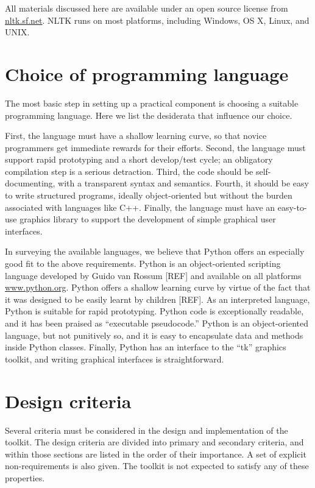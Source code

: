 \documentclass[11pt]{article}
\begin{document}
All materials discussed here are available under an open
source license from \url{nltk.sf.net}.
NLTK runs on most platforms, including Windows, OS X, Linux, and
UNIX.

\section{Choice of programming language}

The most basic step in setting up a practical component is choosing a
suitable programming language.  Here we list the desiderata that influence
our choice.

First, the language must have a shallow learning curve, so that novice
programmers get immediate rewards for their efforts.
Second, the language must support rapid prototyping and a short develop/test cycle;
an obligatory compilation step is a serious detraction.
Third, the code should be self-documenting,
with a transparent syntax and semantics.
Fourth, it should be easy to write structured programs, ideally object-oriented
but without the burden associated with languages like C++.
Finally, the language must have an easy-to-use graphics library to support
the development of simple graphical user interfaces.

In surveying the available languages, we believe that Python offers an especially good
fit to the above requirements.  Python is an object-oriented scripting language
developed by Guido van Rossum [REF] and available on all platforms
\url{www.python.org}.
Python offers a shallow learning curve by virtue of the
fact that it was designed to be easily learnt by children [REF].
As an interpreted language, Python is suitable for rapid prototyping.
Python code is exceptionally readable, and it has been praised as
``executable pseudocode.''
Python is an object-oriented language, but not punitively so, and it
is easy to encapsulate data and methods inside Python classes.
Finally, Python has an interface to the ``tk'' graphics toolkit, and
writing graphical interfaces is straightforward.

\section{Design criteria}


Several criteria must be considered in the design and implementation
of the toolkit.  The design criteria are divided into primary and
secondary criteria, and within those sections are listed in the order
of their importance.  A set of explicit non-requirements is also
given.  The toolkit is not expected to satisfy any of these
properties. 
\end{document}

